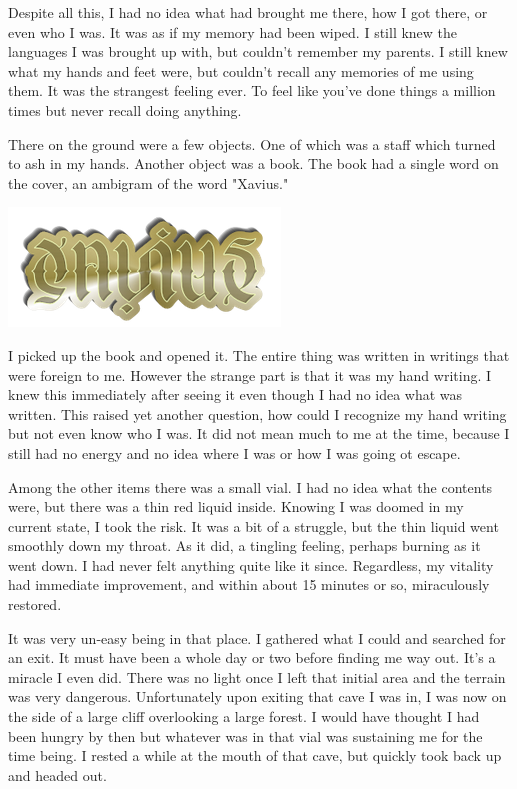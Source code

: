 \documentclass[11pt]{article}
\begin{document}
Despite all this, I had no idea what had brought me there, how I got there, or even who I was. It was as if my memory had been wiped. I still knew the languages I was brought up with, but couldn't remember my parents. I still knew what my hands and feet were, but couldn't recall any memories of me using them. It was the strangest feeling ever. To feel like you've done things a million times but never recall doing anything. 

There on the ground were a few objects. One of which was a staff which turned to ash in my hands. Another object was a book. The book had a single word on the cover, an ambigram of the word "Xavius."

\begin{center}
	\includegraphics[]{./ambigram.png}
\end{center}

I picked up the book and opened it. The entire thing was written in writings that were foreign to me. However the strange part is that it was my hand writing. I knew this immediately after seeing it even though I had no idea what was written. This raised yet another question, how could I recognize my hand writing but not even know who I was. It did not mean much to me at the time, because I still had no energy and no idea where I was or how I was going ot escape.

Among the other items there was a small vial. I had no idea what the contents were, but there was a thin red liquid inside. Knowing I was doomed in my current state, I took the risk. It was a bit of a struggle, but the thin liquid went smoothly down my throat. As it did, a tingling feeling, perhaps burning as it went down. I had never felt anything quite like it since. Regardless, my vitality had immediate improvement, and within about 15 minutes or so, miraculously restored. 

It was very un-easy being in that place. I gathered what I could and searched for an exit. It must have been a whole day or two before finding me way out. It's a miracle I even did. There was no light once I left that initial area and the terrain was very dangerous. Unfortunately upon exiting that cave I was in, I was now on the side of a large cliff overlooking a large forest. I would have thought I had been hungry by then but whatever was in that vial was sustaining me for the time being. I rested a while at the mouth of that cave, but quickly took back up and headed out.
\end{document}

